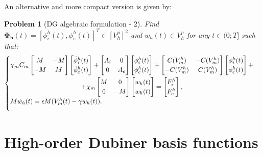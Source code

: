 \documentclass[a4paper,11pt]{article}
\newtheorem{problem}{Problem}
\begin{document}
 \noindent An alternative and more compact version is given by: \vspace{3mm}
 \begin{problem}[DG algebraic formulation - 2] \label{block_matrix}
 Find $\bm{\Phi_h}(t)=[\phi_i^h(t),\phi_e^h(t)]^T \in [V_h^p]^2$ and $w_h(t) \in V_h^p$ for any $t \in (0;T]$ such that:
 \begin{equation*}
 \begin{cases}
 \begin{gathered}
 \chi_mC_m \begin{bmatrix}M &-M \\ -M & M \end{bmatrix}
	\begin{bmatrix}\dot{\phi}_i^h(t) \\ \dot{\phi}_e^h(t) \end{bmatrix}
	 + \begin{bmatrix}A_i & 0 \\ 0 & A_e \end{bmatrix}
	 \begin{bmatrix}\phi_i^h(t) \\ \phi_e^h(t) \end{bmatrix} +
	   \begin{bmatrix}C(V_m^h) & -C(V_m^h) \\ -C(V_m^h) & C(V_m^h) \end{bmatrix} 
	   \begin{bmatrix} \phi_i^h(t) \\ \phi_e^h(t)  \end{bmatrix}+\\
	   +\chi_m \begin{bmatrix}M & 0 \\ 0 & -M \end{bmatrix} 
	   	\begin{bmatrix}w_h(t) \\ w_h(t) \end{bmatrix} = 
	   	\begin{bmatrix} F_i^h \\ F_e^h\end{bmatrix},
	   	\end{gathered}\\
	   	\vspace{3mm} 
	  M \dot{w}_h(t)= \epsilon M (V_m^h(t)-\gamma w_h(t)).
\end{cases}
\end{equation*}
\end{problem}
\newpage
\section{High-order Dubiner basis functions}
\end{document}
